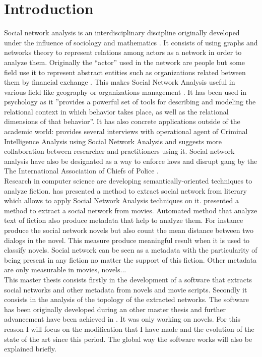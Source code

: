 \documentclass[a4paper, 12pt]{report}
\begin{document}
\chapter{Introduction}
Social network analysis is an interdisciplinary discipline originally developed under the influence of sociology and mathematics \citep{history_social}. It consists of using graphs and networks theory to represent relations among actors as a network in order to analyze them.  Originally the ``actor'' used in the network are people but some field use it to represent abstract entities such as organizations related between them by financial exchange \citep{general_sna}. This makes Social Network Analysis useful in various field like geography \citep{economic_geography} or organizations  management \citep{management}.  It has been used in psychology \citep{psy} as  it ''provides a powerful set of tools for describing and modeling the relational context in which behavior takes place, as well as the relational dimensions of that behavior''\citep{intro}. It has also concrete applications outside of the academic world: \cite{criminal} provides several interviews with operational agent of  Criminal Intelligence Analysis using Social Network Analysis and suggests more collaboration between researcher and practitioners using it.  Social network analysis have also be designated as a way to enforce laws and disrupt gang by the The International Association of Chiefs of Police \citep{police}. \\

Research in computer science are developing semantically-oriented techniques to analyze fiction. \cite{character_country} has presented a method to extract social network from literary which allows to apply Social Network Analysis techniques on it. \cite{movie} presented a method to extract a social network from movies. Automated method that analyze text of fiction also produce metadata that help to analyze them. For instance \cite{original} produce the social network novels but also count the mean distance between two dialogs in the novel. This measure produce meaningful result when it is used to classify novels. Social network can be seen as a metadata with the particularity of being present in any fiction no matter the support of this fiction. Other metadata are only measurable in movies, novels... \\

This master thesis consists firstly in the development of a software that extracts social networks and other metadata from novels and movie scripts. Secondly it consists in the analysis of the topology of the extracted networks. The software has been originally developed during an other master thesis \citep{original_thesis} and further advancement have been achieved in \cite{original}. It was only working on novels. For this reason I will focus on the modification that I have made and the evolution of the state of the art since this period. The global way the software works will also be explained briefly. \\
\end{document}
